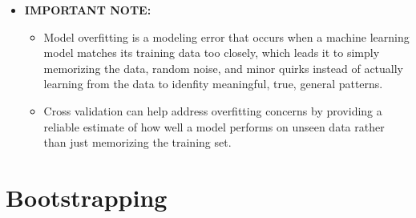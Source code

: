 \documentclass[
  letterpaper,
  DIV=11,
  numbers=noendperiod]{scrreprt}
\providecommand{\tightlist}{%
  \setlength{\itemsep}{0pt}\setlength{\parskip}{0pt}}
\begin{document}
\begin{itemize}
  \begin{itemize}
  \tightlist
  \item
    \textbf{IMPORTANT NOTE:}

    \begin{itemize}
    \tightlist
    \item
      Model overfitting is a modeling error that occurs when a machine
      learning model matches its training data too closely, which leads
      it to simply memorizing the data, random noise, and minor quirks
      instead of actually learning from the data to idenfity meaningful,
      true, general patterns.
    \item
      Cross validation can help address overfitting concerns by
      providing a reliable estimate of how well a model performs on
      unseen data rather than just memorizing the training set.
    \end{itemize}
  \end{itemize}
\end{itemize}


\chapter{Bootstrapping}\label{bootstrapping-1}
\end{document}

